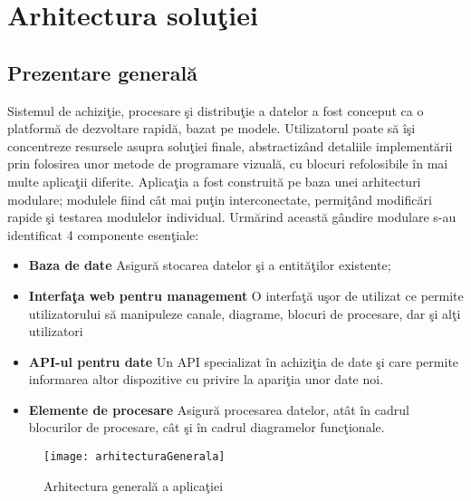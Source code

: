 \chapter{Arhitectura soluţiei}
\label{chapter:arhitecture}

\section{Prezentare generală}
Sistemul de achiziţie, procesare şi distribuţie a datelor a fost conceput ca o platformă de dezvoltare rapidă, bazat pe modele. Utilizatorul poate să îşi concentreze resursele asupra soluţiei finale, abstractizând detaliile implementării prin folosirea unor metode de programare vizuală, cu blocuri refolosibile în mai multe aplicaţii diferite. 
Aplicaţia a fost construită pe baza unei arhitecturi modulare; modulele fiind cât mai puţin interconectate, permiţând modificări rapide şi testarea modulelor individual. Urmărind această gândire modulare s-au identificat 4 componente esenţiale: 
\begin{itemize}
	\item \textbf{Baza de date} Asigură stocarea datelor şi a entităţilor existente;
	\item \textbf{Interfaţa web pentru management} O interfaţă uşor de utilizat ce permite  utilizatorului să manipuleze canale, diagrame, blocuri de procesare, dar şi alţi utilizatori
	\item \textbf{API-ul pentru date} Un API specializat în achiziţia de  date şi care permite informarea altor dispozitive cu privire la apariţia unor date noi.
	\item \textbf{Elemente de procesare} Asigură procesarea datelor, atât în cadrul blocurilor de procesare, cât şi în cadrul diagramelor funcţionale.
\end{itemize}
\begin{figure}
	\centering
	\texttt{[image: arhitecturaGenerala]}
	\caption{Arhitectura generală a aplicaţiei}
	\label{fig:arhitecture}
\end{figure}

